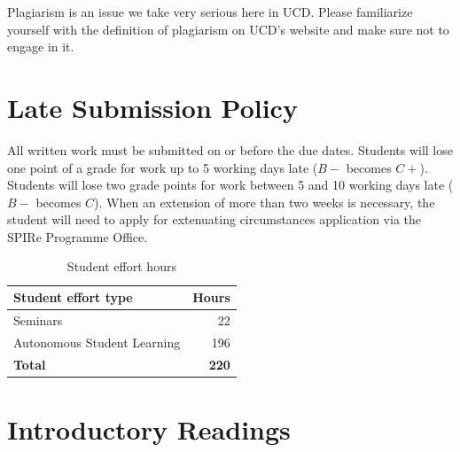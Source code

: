 \documentclass[abstract=on,parskip=full,headings=standardclasses,fontsize=11pt,paper=a4]{scrartcl}
\begin{document}
Plagiarism is an issue we take very serious here in UCD. Please familiarize yourself with the definition of plagiarism on UCD's website and make sure not to engage in it.



\section*{Late Submission Policy}

All written work must be submitted on or before the due dates. Students will lose one point of a grade for work up to 5 working days late ($B-$ becomes $C+$). Students will lose two grade points for work between 5 and 10 working days late ($B-$ becomes $C$). When an extension of more than two weeks is necessary, the student will need to apply for extenuating circumstances application via the SPIRe Programme Office.

\begin{table}[h] \centering \onehalfspacing
\caption*{Student effort hours}
\begin{tabular}{ l r} 
\toprule
Student effort type &  Hours \\
\midrule
Seminars & 22 \\
Autonomous Student Learning  & 196 \\
\textbf{Total} & \textbf{220} \\
\bottomrule
\end{tabular}
\end{table}



\section*{Introductory Readings}
\end{document}
